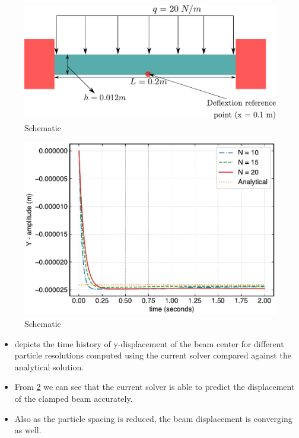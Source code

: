 \documentclass[10pt, conference]{FMFP2022}
\begin{document}
\begin{figure}[!htpb]
  \centering
  \includegraphics[scale=0.5]{images/khayyer_2021_udl/schematic}
  \caption{Schematic}
\label{fig:udl-schematic}
\end{figure}


\begin{figure}[H]
  \centering
  \includegraphics[scale=0.5]{figures/khayyer_2021_udl/homogenous}
  \caption{Schematic}
\label{fig:udl-disp-plot}
\end{figure}
\begin{itemize}
\item [1]  depicts the time history of y-displacement of
  the beam center for different particle resolutions computed using the current
  solver compared against the analytical solution.
\item [2] From \cref{fig:udl-disp-plot} we can see that the current solver is
  able to predict the displacement of the clamped beam accurately.
\item [3] Also as the particle spacing is reduced, the beam displacement
  is converging as well.
\end{itemize}
\end{document}
